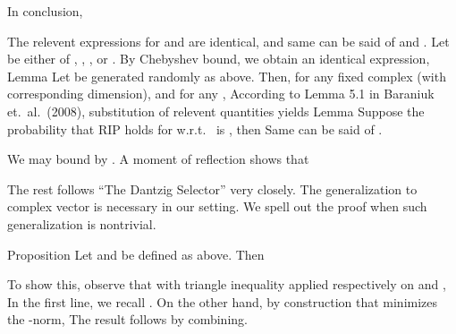 In conclusion,

\stopsection

\startsection [title={RIP of Precoders and Combiners}]

The relevent expressions for  and  are identical, and same can be said of  and .
Let \m {\Phi} be either of , , , or .
By Chebyshev bound, we obtain an identical expression,
\Result
{Lemma}
{
Let \m {\Phi} be generated randomly as above.
Then, for any fixed complex  (with corresponding dimension), and for any ,
}
According to Lemma 5.1 in Baraniuk et.\ al.\ (2008), substitution of relevent quantities yields
\Result
{Lemma}
{
Suppose the probability that RIP holds for \m {\Phi} w.r.t.\  is , then
Same can be said of .
}

We may bound  by .
A moment of reflection shows that 


\stopsection

\startsection [title={Mean Square Error Analysis for Complex DS}]

The rest follows ``The Dantzig Selector'' very closely.
The generalization to complex vector is necessary in our setting.
We spell out the proof when such generalization is nontrivial.

\Result
{Proposition}
{
Let  and  be defined as above.
Then
}

To show this, observe that with triangle inequality applied respectively on  and ,
In the first line, we recall .
On the other hand, by construction that  minimizes the -norm,
The result follows by combining.

